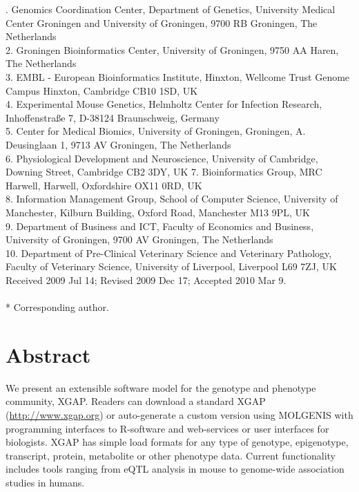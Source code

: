 . Genomics Coordination Center, Department of Genetics, University Medical Center Groningen and University of Groningen, 9700 RB Groningen, The Netherlands\\
2. Groningen Bioinformatics Center, University of Groningen, 9750 AA Haren, The Netherlands\\
3. EMBL - European Bioinformatics Institute, Hinxton, Wellcome Trust Genome Campus Hinxton, Cambridge CB10 1SD, UK\\
4. Experimental Mouse Genetics, Helmholtz Center for Infection Research, Inhoffenstraße 7, D-38124 Braunschweig, Germany\\
5. Center for Medical Biomics, University of Groningen, Groningen, A. Deusinglaan 1, 9713 AV Groningen, The Netherlands\\
6. Physiological Development and Neuroscience, University of Cambridge, Downing Street, Cambridge CB2 3DY, UK
7. Bioinformatics Group, MRC Harwell, Harwell, Oxfordshire OX11 0RD, UK\\
8. Information Management Group, School of Computer Science, University of Manchester, Kilburn Building, Oxford Road, Manchester M13 9PL, UK\\
9. Department of Business and ICT, Faculty of Economics and Business, University of Groningen, 9700 AV Groningen, The Netherlands\\
10. Department of Pre-Clinical Veterinary Science and Veterinary Pathology, Faculty of Veterinary Science, University of Liverpool, Liverpool L69 7ZJ, UK\\

\noindent
Received 2009 Jul 14; Revised 2009 Dec 17; Accepted 2010 Mar 9.
\\~\\
* Corresponding author.


\section*{Abstract}
We present an extensible software model for the genotype and phenotype community, XGAP.
Readers can download a standard XGAP (\url{http://www.xgap.org}) or auto-generate a custom version using MOLGENIS with programming interfaces to R-software and web-services or user interfaces for biologists.
XGAP has simple load formats for any type of genotype, epigenotype, transcript, protein, metabolite or other phenotype data.
Current functionality includes tools ranging from eQTL analysis in mouse to genome-wide association studies in humans.

